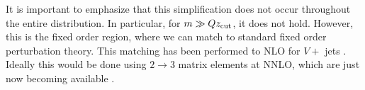 It is important to emphasize that this simplification does not occur throughout the entire distribution. In particular, for $m \gg Qz_{\rm cut}$, it does not hold. However, this is the fixed order region, where we can match to standard fixed order perturbation theory. This matching has been performed to NLO for $V+$ jets \cite{Frye:2016aiz,Marzani:2017kqd,Marzani:2017mva}.  Ideally this would be done using $2\to 3$ matrix elements at NNLO, which are just now becoming available \cite{Gehrmann:2015bfy,Dunbar:2016aux,Badger:2013yda,Badger:2017jhb,Abreu:2017hqn}.



%

%
%


%
%
%


